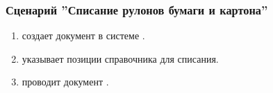 









\subsubsection{Сценарий ''Списание рулонов бумаги и картона''}
\label{bp:storage_8}

\bigskip

\begin{enumerate}
\item \kladovshik создает документ  в системе \gofro.
\item \kladovshik указывает позиции справочника  для списания.
\item \kladovshik проводит документ .

\end{enumerate}


